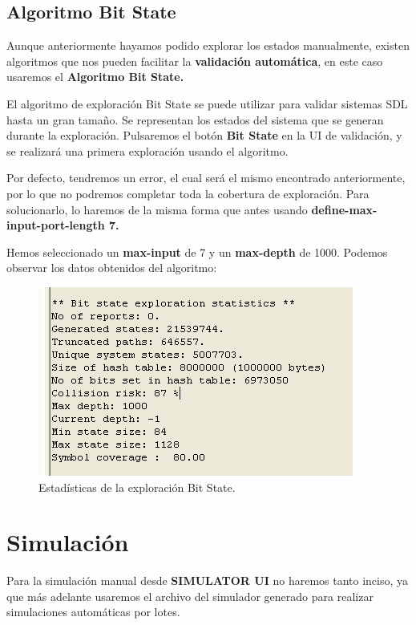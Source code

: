 \documentclass{article}
\begin{document}
\subsection{Algoritmo Bit State}

Aunque anteriormente hayamos podido explorar los estados manualmente, existen algoritmos que nos pueden facilitar la \textbf{validación automática}, en este caso usaremos el \textbf{Algoritmo Bit State.}

El algoritmo de exploración Bit State se puede utilizar para validar sistemas SDL hasta un gran tamaño. Se representan los estados del sistema que se generan durante la exploración. Pulsaremos el botón \textbf{Bit State} en la UI de validación, y se realizará una primera exploración usando el algoritmo.

\quad 

Por defecto, tendremos un error, el cual será el mismo encontrado anteriormente, por lo que no podremos completar toda la cobertura de exploración. Para solucionarlo, lo haremos de la misma forma que antes usando \textbf{define-max-input-port-length 7.}

Hemos seleccionado un \textbf{max-input} de 7 y un \textbf{max-depth} de 1000. Podemos observar los datos obtenidos del algoritmo:
 
\begin{figure}[ht]
    \centering
    \includegraphics[width=0.65\linewidth]{src/bit state.png}
    \caption{\label{fig:bitstate} Estadísticas de la exploración Bit State.}
\end{figure}

\newpage

\section{Simulación}

Para la simulación manual desde \textbf{SIMULATOR UI} no haremos tanto inciso, ya que más adelante usaremos el archivo del simulador generado para realizar simulaciones automáticas por lotes. 
\end{document}

